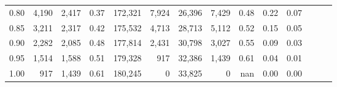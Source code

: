 \begin{tabular}{rrrrrrrrrrrrrr}
0.80 &   4,190 &  2,417 &  0.37 &  172,321 &    7,924 &  26,396 &   7,429 &  0.48 &  0.22 &      0.07 \\
0.85 &   3,211 &  2,317 &  0.42 &  175,532 &    4,713 &  28,713 &   5,112 &  0.52 &  0.15 &      0.05 \\
0.90 &   2,282 &  2,085 &  0.48 &  177,814 &    2,431 &  30,798 &   3,027 &  0.55 &  0.09 &      0.03 \\
0.95 &   1,514 &  1,588 &  0.51 &  179,328 &      917 &  32,386 &   1,439 &  0.61 &  0.04 &      0.01 \\
1.00 &     917 &  1,439 &  0.61 &  180,245 &        0 &  33,825 &       0 &   nan &  0.00 &      0.00 \\
\bottomrule
\end{tabular}

